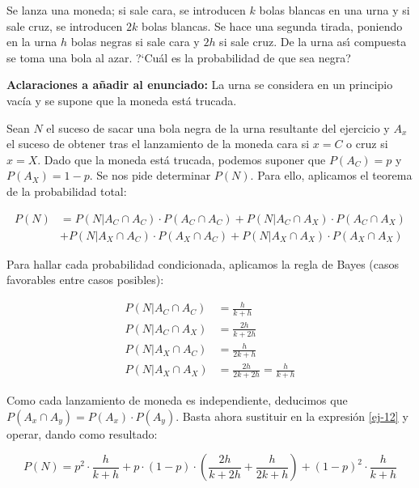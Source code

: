 \problem
Se lanza una moneda; si sale cara, se introducen  $k$ bolas blancas en una urna
y si sale cruz, se introducen  $2k$ bolas blancas. Se hace una  segunda  tirada,
poniendo en la urna $h$ bolas negras si sale cara y $2h$ si sale cruz. De la urna  as{\'\i}
compuesta se toma una bola al azar. ?`Cu{\'a}l es la probabilidad de que sea
negra?

\textbf{Aclaraciones a añadir al enunciado:} La urna se considera en un principio vacía y se supone que la moneda está trucada. 

Sean $N$ el suceso de sacar una bola negra de la urna resultante del ejercicio y $A_{x}$ el suceso de obtener tras el lanzamiento de la moneda cara si  $x=C$ o cruz si $x=X$. Dado que la moneda está trucada, podemos suponer que $P(A_C) = p$ y $P(A_X) = 1 - p$. Se nos pide determinar $P(N)$. Para ello, aplicamos el teorema de la probabilidad total: 


\begin{equation} \label{ej-12}
\begin{split}
P(N) & =  P(N|A_C \cap A_C) · P(A_C \cap A_C) + P(N|A_C \cap A_X) · P(A_C \cap A_X) \\
& + P(N|A_X \cap A_C) · P(A_X \cap A_C) + P(N|A_X \cap A_X) · P(A_X \cap A_X)
\end{split}
\end{equation}

Para hallar cada probabilidad condicionada, aplicamos la regla de Bayes (casos favorables entre casos posibles):

\begin{equation*}
\begin{split}
P(N|A_C \cap A_C) & = \frac{h}{k+h} \\
P(N|A_C \cap A_X) & = \frac{2h}{k+2h} \\
P(N|A_X \cap A_C) & = \frac{h}{2k+h} \\
P(N|A_X \cap A_X) & = \frac{2h}{2k+2h} = \frac{h}{k+h}
\end{split}
\end{equation*}

Como cada lanzamiento de moneda es independiente, deducimos que $P(A_x \cap A_y) = P(A_x) · P(A_y)$. Basta ahora sustituir en la expresión \ref{ej-12} y operar, dando como resultado:

$$P(N) = p^2·\frac{h}{k+h} + p·(1-p)·(\dfrac{2h}{k+2h} + \frac{h}{2k+h}) + (1-p)^2·\frac{h}{k+h}$$